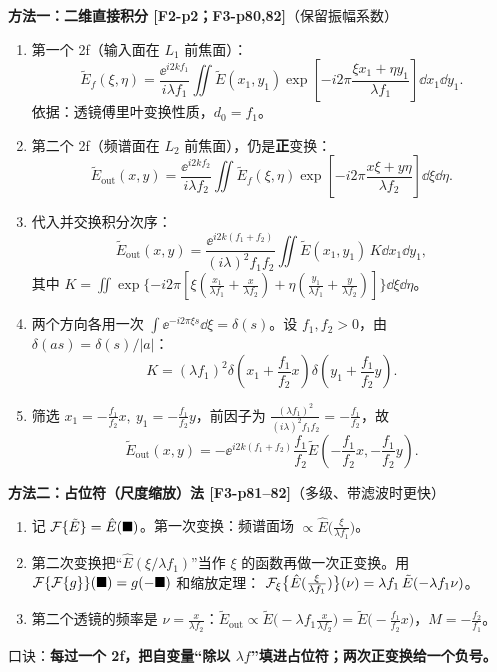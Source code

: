 \textbf{方法一：二维直接积分 [F2-p2；F3-p80,82]}（保留振幅系数）
\begin{enumerate}
\item 第一个 2f（输入面在 $L_1$ 前焦面）：
\[
\tilde E_f(\xi,\eta)=\frac{\ee^{i2kf_1}}{i\lambda f_1}\iint\tilde E(x_1,y_1)\exp\!\left[-i2\pi\frac{\xi x_1+\eta y_1}{\lambda f_1}\right]\dd x_1\dd y_1.
\]
依据：透镜傅里叶变换性质，$d_0=f_1$。
\item 第二个 2f（频谱面在 $L_2$ 前焦面），仍是\textbf{正}变换：
\[
\tilde E_{\text{out}}(x,y)=\frac{\ee^{i2kf_2}}{i\lambda f_2}\iint\tilde E_f(\xi,\eta)\exp\!\left[-i2\pi\frac{x\xi+y\eta}{\lambda f_2}\right]\dd\xi\dd\eta.
\]
\item 代入并交换积分次序：
\[
\tilde E_{\text{out}}(x,y)=\frac{\ee^{i2k(f_1+f_2)}}{(i\lambda)^2f_1f_2}\iint\tilde E(x_1,y_1)\,K\dd x_1\dd y_1,
\]
其中 $K=\iint\exp\{-i2\pi[\xi(\frac{x_1}{\lambda f_1}+\frac{x}{\lambda f_2})+\eta(\frac{y_1}{\lambda f_1}+\frac{y}{\lambda f_2})]\}\dd\xi\dd\eta$。
\item 两个方向各用一次 $\int\ee^{-i2\pi\xi s}\dd\xi=\delta(s)$。设 $f_1,f_2>0$，由 $\delta(as)=\delta(s)/|a|$：
\[
K=(\lambda f_1)^2\delta\!\left(x_1+\frac{f_1}{f_2}x\right)\delta\!\left(y_1+\frac{f_1}{f_2}y\right).
\]
\item 筛选 $x_1=-\frac{f_1}{f_2}x,\ y_1=-\frac{f_1}{f_2}y$，前因子为 $\frac{(\lambda f_1)^2}{(i\lambda)^2f_1f_2}=-\frac{f_1}{f_2}$，故
\[
\tilde E_{\text{out}}(x,y)=-\ee^{i2k(f_1+f_2)}\frac{f_1}{f_2}\tilde E\!\left(-\frac{f_1}{f_2}x,-\frac{f_1}{f_2}y\right).
\]
\end{enumerate}

\textbf{方法二：占位符（尺度缩放）法 [F3-p81–82]}（多级、带滤波时更快）
\begin{enumerate}
\item 记 $\mathcal{F}\{\tilde E\}=\hat E(\blacksquare)$。第一次变换：频谱面场 $\propto\hat E\big(\frac{\xi}{\lambda f_1}\big)$。
\item 第二次变换把“$\hat E(\xi/\lambda f_1)$”当作 $\xi$ 的函数再做一次正变换。用 $\mathcal{F}\{\mathcal{F}\{g\}\}(\blacksquare)=g(-\blacksquare)$ 和缩放定理：
$\mathcal{F}_\xi\big\{\hat E(\tfrac{\xi}{\lambda f_1})\big\}(\nu)=\lambda f_1\,\tilde E(-\lambda f_1\nu)$。
\item 第二个透镜的频率是 $\nu=\frac{x}{\lambda f_2}$：$\tilde E_{\text{out}}\propto\tilde E\big(-\lambda f_1\frac{x}{\lambda f_2}\big)=\tilde E\big(-\frac{f_1}{f_2}x\big)$，$M=-\frac{f_2}{f_1}$。
\end{enumerate}
口诀：\textbf{每过一个 2f，把自变量“除以 $\lambda f$”填进占位符；两次正变换给一个负号。}

